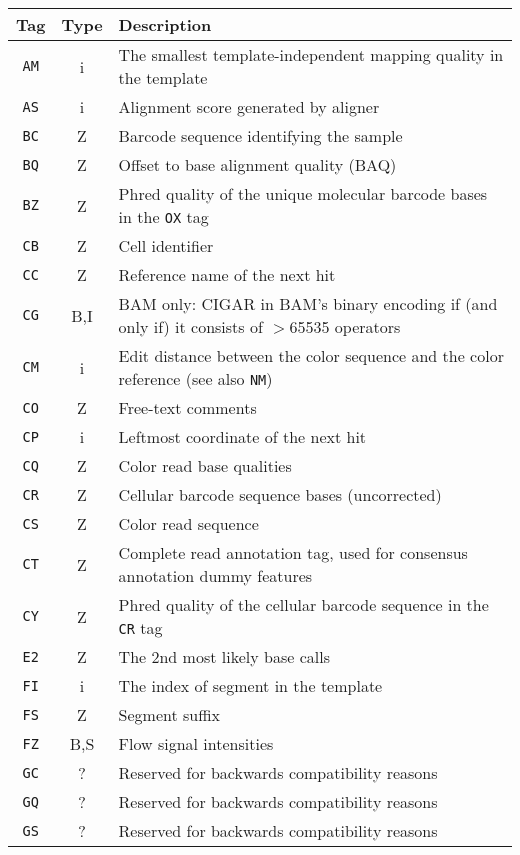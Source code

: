 \documentclass[10pt]{article}
\begin{document}
\begin{center}\small
\begin{longtable}{ccp{12.5cm}}
  \hline
  {\bf Tag} & {\bf Type} & {\bf Description} \\
  \hline
  \endhead
  {\tt AM} & i & The smallest template-independent mapping quality in the template \\
  {\tt AS} & i & Alignment score generated by aligner \\
  {\tt BC} & Z & Barcode sequence identifying the sample \\
  {\tt BQ} & Z & Offset to base alignment quality (BAQ) \\
  {\tt BZ} & Z & Phred quality of the unique molecular barcode bases in the {\tt OX} tag \\
  {\tt CB} & Z & Cell identifier \\
  {\tt CC} & Z & Reference name of the next hit \\
  {\tt CG} & B,I & BAM only: {\sf CIGAR} in BAM's binary encoding if (and only if) it consists of $>$65535 operators \\
  {\tt CM} & i & Edit distance between the color sequence and the color reference (see also {\tt NM}) \\
  {\tt CO} & Z & Free-text comments \\
  {\tt CP} & i & Leftmost coordinate of the next hit \\
  {\tt CQ} & Z & Color read base qualities \\
  {\tt CR} & Z & Cellular barcode sequence bases (uncorrected) \\
  {\tt CS} & Z & Color read sequence \\
  {\tt CT} & Z & Complete read annotation tag, used for consensus annotation dummy features \\
  {\tt CY} & Z & Phred quality of the cellular barcode sequence in the {\tt CR} tag \\
  {\tt E2} & Z & The 2nd most likely base calls \\
  {\tt FI} & i & The index of segment in the template \\
  {\tt FS} & Z & Segment suffix \\
  {\tt FZ} & B,S & Flow signal intensities \\
  {\tt GC} & ? & Reserved for backwards compatibility reasons \\
  {\tt GQ} & ? & Reserved for backwards compatibility reasons \\
  {\tt GS} & ? & Reserved for backwards compatibility reasons \\

\end{longtable}
\end{center}
\end{document}
